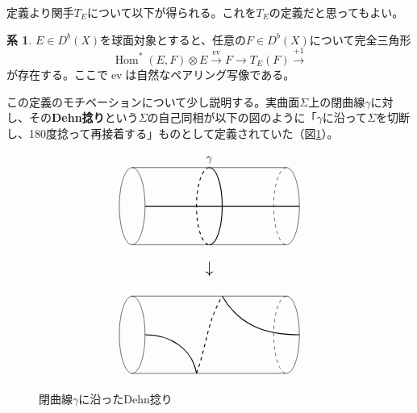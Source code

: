 \documentclass[uplatex,11pt,a4paper,dvipdfmx]{jsarticle}
\numberwithin{equation}{section}
\numberwithin{figure}{section}
\theoremstyle{definition}
\newtheorem{corollary}[theorem]{系}
\DeclareMathOperator{\Hom}{\mathrm{Hom}}
\DeclareMathOperator{\ev}{\mathrm{ev}}
\begin{document}
定義より関手$T_E$について以下が得られる。これを$T_E$の定義だと思ってもよい。
\begin{corollary}
    $E \in D^b(X)$を球面対象とすると、任意の$F \in D^b(X)$について完全三角形
    \begin{equation}\label{eq:twist}
        \Hom^*(E, F) \otimes E \xrightarrow{\ev} F \to T_E (F) \xrightarrow{+1}
    \end{equation}
    が存在する。ここで$\ev$は自然なペアリング写像である。
\end{corollary}
この定義のモチベーションについて少し説明する。実曲面$\Sigma$上の閉曲線$\gamma$に対し、その\textbf{Dehn捻り}という$\Sigma$の自己同相が以下の図のように「$\gamma$に沿って$\Sigma$を切断し、180度捻って再接着する」ものとして定義されていた（図\ref{fig:dehn-twist}）。


\begin{figure}[h]
    \centering
    \begin{displaymath}
        \begin{tikzpicture}[scale=0.8]
            \draw (0,0+5)--(6,0+5);
            \draw (0,3+5)--(6,3+5);

            \draw[thick] (0.5, 1.5+5)--(6.5, 1.5+5);

            \draw (0, 1.5+5) circle[x radius=0.5, y radius=1.5];

            \draw(6, 0+5)arc(-90:90:0.5 and 1.5);
            \draw[dashed](6, 3+5)arc(90:270:0.5 and 1.5);

            \draw[thick](3, 0+5)arc(-90:90:0.5 and 1.5);
            \draw[thick, dashed](3, 3+5)arc(90:270:0.5 and 1.5);


            \draw(3, 3+5) node[above]{$\gamma$};

            \draw(3, -0.5+5) node[below]{\Large$\downarrow$};


            \draw (0,0)--(6,0);
            \draw (0,3)--(6,3);

            \draw (0, 1.5) circle[x radius=0.5, y radius=1.5];

            \draw(6, 0)arc(-90:90:0.5 and 1.5);
            \draw[dashed](6, 3)arc(90:270:0.5 and 1.5);

            \draw[thick](0.5, 1.5) to[out=0,in=100](2.5, 0);
            \draw[thick, dashed](2.5, 0) to[out=70,in=-120](3.5, 3);
            \draw[thick](3.5, 3) to[out=-60,in=180](6.5, 1.5);
        \end{tikzpicture}
    \end{displaymath}
    \caption{閉曲線$\gamma$に沿ったDehn捻り}
    \label{fig:dehn-twist}
\end{figure}
\end{document}
